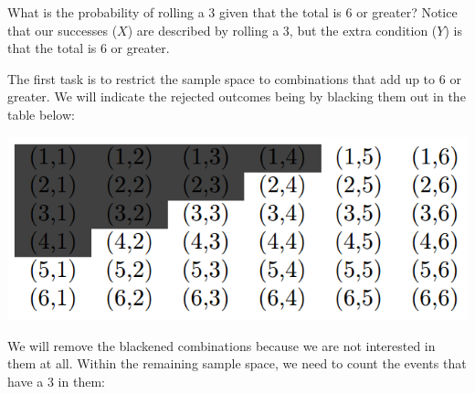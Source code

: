 \documentclass{ximera}
\begin{document}
What is the probability of rolling a 3 given that the total is 6 or greater? Notice that our successes ($X$) are described by rolling a 3, but the extra condition ($Y$) is that the total is 6 or greater.

The first task is to restrict the sample space to combinations that add up to 6 or greater. We will indicate the rejected outcomes being by blacking them out in the table below:
\begin{image}
\includegraphics{ConditionalProbTable2.png}
\end{image}
We will remove the blackened combinations because we are not interested in them at all. Within the remaining sample space, we need to count the events that have a 3 in them:
\end{document}
